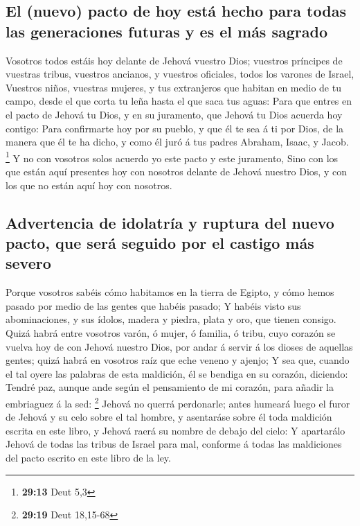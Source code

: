 \hypertarget{el-nuevo-pacto-de-hoy-estuxe1-hecho-para-todas-las-generaciones-futuras-y-es-el-muxe1s-sagrado}{%
\subsection{El (nuevo) pacto de hoy está hecho para todas las
generaciones futuras y es el más
sagrado}\label{el-nuevo-pacto-de-hoy-estuxe1-hecho-para-todas-las-generaciones-futuras-y-es-el-muxe1s-sagrado}}

 Vosotros todos estáis hoy delante de Jehová vuestro Dios;
vuestros príncipes de vuestras tribus, vuestros ancianos, y vuestros
oficiales, todos los varones de Israel,  Vuestros niños,
vuestras mujeres, y tus extranjeros que habitan en medio de tu campo,
desde el que corta tu leña hasta el que saca tus aguas: 
Para que entres en el pacto de Jehová tu Dios, y en su juramento, que
Jehová tu Dios acuerda hoy contigo:  Para confirmarte hoy
por su pueblo, y que él te sea á ti por Dios, de la manera que él te ha
dicho, y como él juró á tus padres Abraham, Isaac, y Jacob. \footnote{\textbf{29:13}
  Deut 5,3}  Y no con vosotros solos acuerdo yo este pacto
y este juramento,  Sino con los que están aquí presentes
hoy con nosotros delante de Jehová nuestro Dios, y con los que no están
aquí hoy con nosotros.

\hypertarget{advertencia-de-idolatruxeda-y-ruptura-del-nuevo-pacto-que-seruxe1-seguido-por-el-castigo-muxe1s-severo}{%
\subsection{Advertencia de idolatría y ruptura del nuevo pacto, que será
seguido por el castigo más
severo}\label{advertencia-de-idolatruxeda-y-ruptura-del-nuevo-pacto-que-seruxe1-seguido-por-el-castigo-muxe1s-severo}}

 Porque vosotros sabéis cómo habitamos en la tierra de
Egipto, y cómo hemos pasado por medio de las gentes que habéis pasado;
 Y habéis visto sus abominaciones, y sus ídolos, madera y
piedra, plata y oro, que tienen consigo.  Quizá habrá entre
vosotros varón, ó mujer, ó familia, ó tribu, cuyo corazón se vuelva hoy
de con Jehová nuestro Dios, por andar á servir á los dioses de aquellas
gentes; quizá habrá en vosotros raíz que eche veneno y ajenjo;
 Y sea que, cuando el tal oyere las palabras de esta
maldición, él se bendiga en su corazón, diciendo: Tendré paz, aunque
ande según el pensamiento de mi corazón, para añadir la embriaguez á la
sed: \footnote{\textbf{29:19} Deut 18,15-68}  Jehová no
querrá perdonarle; antes humeará luego el furor de Jehová y su celo
sobre el tal hombre, y asentaráse sobre él toda maldición escrita en
este libro, y Jehová raerá su nombre de debajo del cielo: 
Y apartarálo Jehová de todas las tribus de Israel para mal, conforme á
todas las maldiciones del pacto escrito en este libro de la ley.

